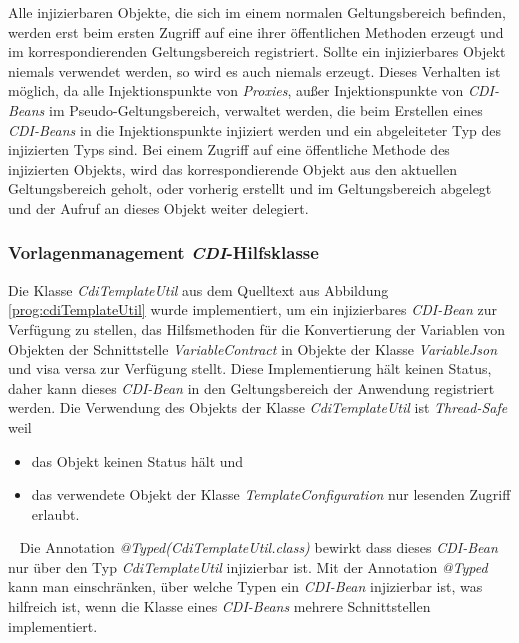\newline
\newline
Alle injizierbaren Objekte, die sich im einem normalen Geltungsbereich befinden,  werden erst beim ersten Zugriff auf eine ihrer öffentlichen Methoden erzeugt und im korrespondierenden Geltungsbereich registriert. Sollte ein injizierbares Objekt niemals verwendet werden, so wird es auch niemals erzeugt. Dieses Verhalten ist möglich, da alle Injektionspunkte von \emph{Proxies}, außer Injektionspunkte von \emph{CDI-Beans} im Pseudo-Geltungsbereich, verwaltet werden, die beim Erstellen eines \emph{CDI-Beans} in die Injektionspunkte injiziert werden und ein abgeleiteter Typ des injizierten Typs sind. Bei einem Zugriff auf eine öffentliche Methode des injizierten Objekts, wird das korrespondierende Objekt aus den aktuellen Geltungsbereich geholt, oder vorherig erstellt und im Geltungsbereich abgelegt und der Aufruf an dieses Objekt weiter delegiert.  

\subsubsection{Vorlagenmanagement \emph{CDI}-Hilfsklasse}
Die Klasse \emph{CdiTemplateUtil} aus dem Quelltext aus Abbildung \ref{prog:cdiTemplateUtil} wurde implementiert, um ein injizierbares \emph{CDI-Bean} zur Verfügung zu stellen, das Hilfsmethoden für die Konvertierung der Variablen von Objekten der Schnittstelle \emph{VariableContract} in Objekte der Klasse \emph{VariableJson} und visa versa zur Verfügung stellt. Diese Implementierung hält keinen Status, daher kann dieses \emph{CDI-Bean} in den Geltungsbereich der Anwendung registriert werden. Die Verwendung des Objekts der Klasse \emph{CdiTemplateUtil} ist \emph{Thread-Safe} weil
\begin{itemize}
	\item das Objekt keinen Status hält und
	\item das verwendete Objekt der Klasse \emph{TemplateConfiguration} nur lesenden Zugriff erlaubt.
\end{itemize}
\ \newline
Die Annotation \emph{@Typed(CdiTemplateUtil.class)} bewirkt dass dieses \emph{CDI-Bean} nur über den Typ \emph{CdiTemplateUtil} injizierbar ist. Mit der Annotation \emph{@Typed} kann man einschränken, über welche Typen ein \emph{CDI-Bean} injizierbar ist, was hilfreich ist, wenn die Klasse eines \emph{CDI-Beans} mehrere Schnittstellen implementiert.

